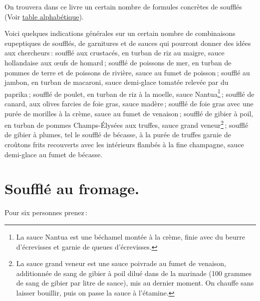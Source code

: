 On trouvera dans ce livre un certain nombre de formules concrètes de soufflés
(Voir \hyperlink{p9001}{table alphabétique}).

\sk

Voici quelques indications générales sur un certain nombre de combinaisons
eupeptiques de soufflés, de garnitures et de sauces qui pourront donner des
idées aux chercheurs : soufflé aux crustacés, en turban de riz au maigre, sauce
hollandaise aux œufs de homard ; soufflé de poissons de mer, en turban de
pommes de terre et de poissons de rivière, sauce au fumet de poisson ; soufflé
au jambon, en turban de macaroni, sauce demi-glace tomatée relevée par du
paprika ; soufflé de poulet, en turban de riz à la moelle, sauce
Nantua\footnote{La sauce Nantua est une béchamel montée à la crème, finie avec
du beurre d'écrevisses et garnie de queues d'écrevisses.} ; soufflé de canard,
aux olives farcies de foie gras, sauce madère ; 
soufflé de foie gras avec une
purée de morilles à la crème, sauce au fumet de venaison ; soufflé de gibier
à poil, en turban de pommes Champs-Élysées aux truffes, sauce grand
veneur\footnote{La sauce grand veneur est une sauce poivrade au fumet de
venaison, additionnée de sang de gibier à poil dilué dans de la marinade (100
grammes de sang de gibier par litre de sauce), mis au dernier moment. On
chauffe sans laisser bouillir, puis on passe la sauce à l'étamine.} ; 
soufflé de gibier à plumes, tel le soufflé de bécasse, à la purée de truffes
garnie de croûtons frits recouverts avec les intérieurs flambés à la fine
champagne, sauce demi-glace au fumet de bécasse.

\section*{\centering Soufflé au fromage.}

Pour six personnes prenez :

\medskip

